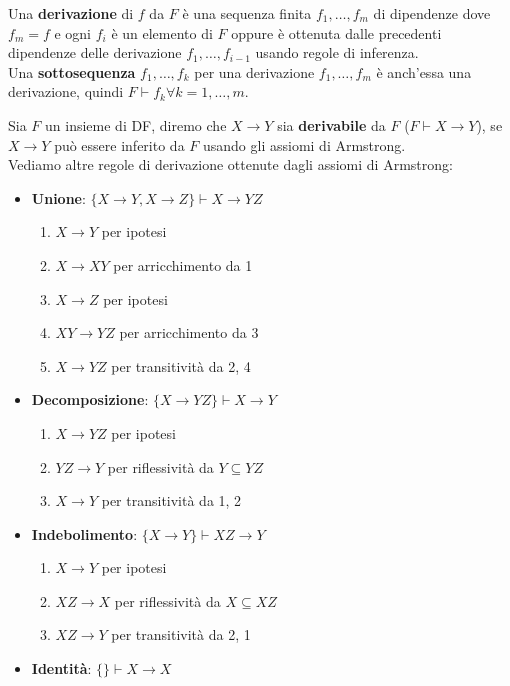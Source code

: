 \begin{definition}[Derivazione]
	Una \textbf{derivazione} di $f$ da $F$ è una sequenza finita $f_1, \ldots, f_m$ di dipendenze dove $f_m = f$ e ogni $f_i$ è un elemento di $F$ oppure è ottenuta dalle	precedenti dipendenze delle derivazione $f_1, \ldots, f_{i-1}$ usando regole di inferenza.\\
	Una \textbf{sottosequenza} $f_1, \ldots, f_k$ per una derivazione $f_1,\ldots, f_m$ è anch’essa	una derivazione, quindi $F \vdash f_k \forall k = 1, \ldots, m$.
\end{definition}
Sia $F$ un insieme di DF, diremo che $X \to Y$ sia \textbf{derivabile} da $F$ ($F \vdash X \to Y$), se $X \to Y$ può essere inferito da $F$ usando gli assiomi di Armstrong.\\
Vediamo altre regole di derivazione ottenute dagli assiomi di Armstrong:
\begin{itemize}
	\item \textbf{Unione}: $\{X \to Y, X \to Z\} \vdash X \to YZ$
	\begin{enumerate}
		\item  $X \to Y$ per ipotesi
		\item $X \to XY$ per arricchimento da 1
		\item $X \to Z$ per ipotesi
		\item $XY \to YZ$ per arricchimento da 3
		\item $X \to YZ$ per transitività da 2, 4
	\end{enumerate}
	\item \textbf{Decomposizione}: $\{X \to YZ\} \vdash X \to Y$
	\begin{enumerate}
		\item $X \to YZ$ per ipotesi
		\item $YZ \to Y$ per riflessività da $Y \subseteq YZ$
		\item $ X \to Y$ per transitività da 1, 2
	\end{enumerate}
	\item \textbf{Indebolimento}: $\{X \to Y\} \vdash XZ \to Y$
	\begin{enumerate}
		\item $X \to Y$ per ipotesi
		\item $XZ \to X$ per riflessività da $X \subseteq XZ$
		\item $ XZ\to Y$ per transitività da 2, 1
	\end{enumerate}
	\item \textbf{Identità}: $\{\} \vdash X \to X$
\end{itemize}
